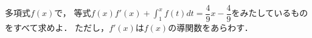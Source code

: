 \documentclass[../../main.tex]{subfiles}
\begin{document}
多項式$f(x)$で，
等式$\displaystyle f(x)f'(x)+\int_1^xf(t)dt=\dfrac{4}{9}x-\dfrac{4}{9}$をみたしているものをすべて求めよ．
ただし，$f'(x)$は$f(x)$の導関数をあらわす．
\end{document}
